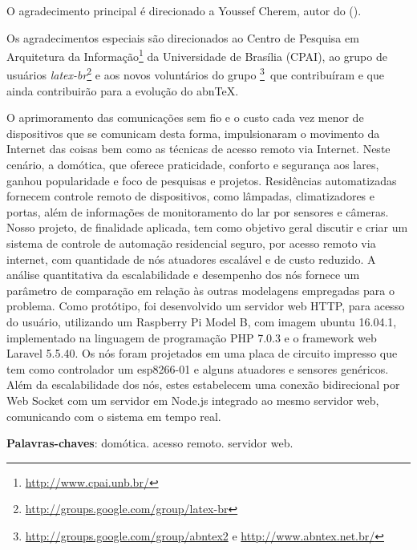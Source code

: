 \documentclass[
	12pt,				%
	openany,			%
	twoside,			%
	a4paper,			%
	english,			%
	french,				%
	spanish,			%
	brazil,				%
	]{abntex2}
\begin{document}
\begin{agradecimentos}
O agradecimento principal é direcionado a Youssef Cherem, autor do
 ().

Os agradecimentos especiais são direcionados ao Centro de Pesquisa em
Arquitetura da Informação\footnote{\url{http://www.cpai.unb.br/}} da Universidade de
Brasília (CPAI), ao grupo de usuários
\emph{latex-br}\footnote{\url{http://groups.google.com/group/latex-br}} e aos
novos voluntários do grupo
\emph{\abnTeX}\footnote{\url{http://groups.google.com/group/abntex2} e
\url{http://www.abntex.net.br/}}~que contribuíram e que ainda
contribuirão para a evolução do abn\TeX.

\end{agradecimentos}
\fi


\setlength{\absparsep}{18pt} %
\begin{resumo}

O aprimoramento das comunicações sem fio e o custo cada vez menor de
dispositivos que se comunicam desta forma, impulsionaram o movimento da
Internet das coisas bem como as técnicas de acesso remoto via Internet. Neste
cenário, a domótica, que oferece praticidade, conforto e segurança aos lares,
ganhou popularidade e foco de pesquisas e projetos. Residências
automatizadas fornecem controle remoto de dispositivos, como lâmpadas,
climatizadores e portas, além de informações de monitoramento do lar por
sensores e câmeras. Nosso projeto, de finalidade aplicada, tem como objetivo
geral discutir e criar um sistema de controle de automação residencial seguro,
por acesso remoto via internet, com quantidade de nós atuadores escalável e
de custo reduzido. A análise quantitativa da escalabilidade e desempenho dos
nós fornece um parâmetro de comparação em relação às outras modelagens
empregadas para o problema. Como protótipo, foi desenvolvido um servidor
web HTTP, para acesso do usuário, utilizando um Raspberry Pi Model B, com
imagem ubuntu 16.04.1, implementado na linguagem de programação PHP
7.0.3 e o framework web Laravel 5.5.40. Os nós foram projetados em uma
placa de circuito impresso que tem como controlador um esp8266-01 e alguns
atuadores e sensores genéricos. Além da escalabilidade dos nós, estes
estabelecem uma conexão bidirecional por Web Socket com um servidor em
Node.js integrado ao mesmo servidor web, comunicando com o sistema em
tempo real.

 \noindent
 \textbf{Palavras-chaves}: domótica. acesso remoto. servidor web.
\end{resumo}
\end{document}
